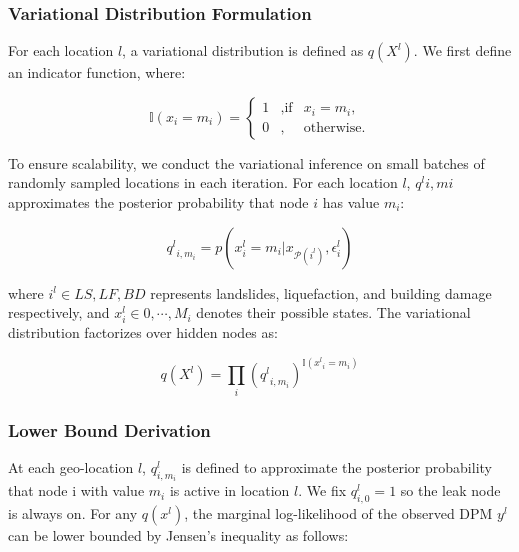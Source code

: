 \documentclass[review]{elsarticle}
\begin{document}
\subsubsection{Variational Distribution Formulation}
For each location $l$, a variational distribution is defined as $q(X^{l})$. We first define an indicator function, where:

\begin{equation*}
\mathbb{I}(x_{i} = m_{i}) = \left\{
        \begin{aligned}
        1 & ,  \text{if} & x_{i} = m_{i}, \\
        0 & , & \text{otherwise.}
        \end{aligned}
        \right.
\end{equation*}

To ensure scalability, we conduct the variational inference on small batches of randomly sampled locations in each iteration. For each location $l$, ${q^{l}}{i, m{i}}$ approximates the posterior probability that node $i$ has value $m_i$:

\begin{equation*}
    {q^{l}}_{i, m_{i}} = p(x_{i}^{l} = m_{i}|x_{\mathcal{P}(i^{l})}, \epsilon_{i}^{l})
\end{equation*}

\noindent where $i^{l} \in {LS, LF, BD}$ represents landslides, liquefaction, and building damage respectively, and $x_{i}^{l} \in {0, \cdots, M_{i}}$ denotes their possible states. The variational distribution factorizes over hidden nodes as:

\begin{equation*}
    q(X^{l}) = {\prod_{i}({q^{l}}_{i, m_{i}})}^{\mathbb{I}({x^{l}}_{i} = m_{i})}
\end{equation*}



\subsubsection{Lower Bound Derivation}

At each geo-location $l$, $q_{i, m_{i}}^{l}$ is defined to approximate the posterior probability that node i with value $m_{i}$ is active in location $l$. We fix $q_{i, 0}^{l} = 1$ so the leak node is always on. For any $q(x^{l})$, the marginal log-likelihood of the observed DPM $y^{l}$ can be lower bounded by Jensen's inequality as follows:
\end{document}
